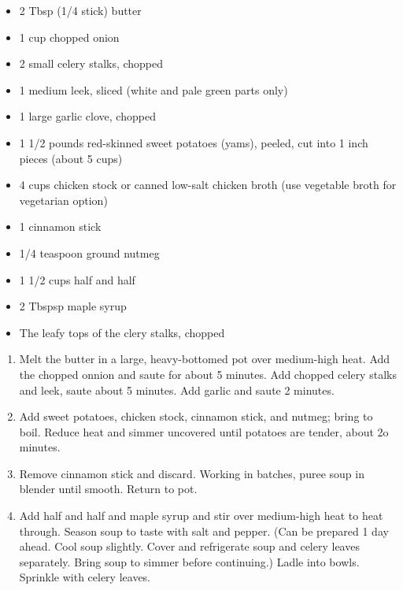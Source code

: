 \documentclass{article}
\begin{document}
\begin{framed}
\begin{itemize}
    \item 2 Tbsp (1/4 stick) butter
    \item 1 cup chopped onion
    \item 2 small celery stalks, chopped
    \item 1 medium leek, sliced (white and pale green parts only)
    \item 1 large garlic clove, chopped
    \item 1 1/2 pounds red-skinned sweet potatoes (yams), peeled, cut into 1 inch pieces (about 5 cups)
    \item 4 cups chicken stock or canned low-salt chicken broth (use vegetable broth for vegetarian option)
    \item 1 cinnamon stick
    \item 1/4 teaspoon ground nutmeg
    \item 1 1/2 cups half and half
    \item 2 Tbspsp maple syrup
    \item The leafy tops of the clery stalks, chopped
\end{itemize}
\end{framed}

\begin{enumerate}
    \item 
        Melt the butter in a large, heavy-bottomed pot over medium-high heat. Add the chopped onnion and saute for about 5 minutes. Add chopped celery stalks and leek, saute about 5 minutes. Add garlic and saute 2 minutes.
    \item
        Add sweet potatoes, chicken stock, cinnamon stick, and nutmeg; bring to boil. Reduce heat and simmer uncovered until potatoes are tender, about 2o minutes.
    \item
        Remove cinnamon stick and discard. Working in batches, puree soup in blender until smooth. Return to pot.
    \item 
        Add half and half and maple syrup and stir over medium-high heat to heat through. Season soup to taste with salt and pepper. (Can be prepared 1 day ahead. Cool soup slightly. Cover and refrigerate soup and celery leaves separately. Bring soup to simmer before continuing.) Ladle into bowls. Sprinkle with celery leaves.
\end{enumerate}
\newpage

\end{document}
